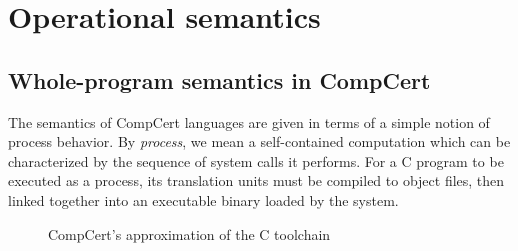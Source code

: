 \documentclass[acmsmall,authordraft]{acmart}
\begin{document}


\section{Operational semantics} \label{sec:sem} %


\subsection{Whole-program semantics in CompCert} \label{sec:sem:closed} %

The semantics of CompCert languages
are given in terms of a simple notion of process behavior.
By \emph{process}, we mean a self-contained computation
which can be characterized by
the sequence of system calls it performs.
For a C program to be executed as a process,
its translation units must be compiled to object files,
then linked together
into an executable binary
loaded by the system.

\begin{figure} %
    \caption{CompCert's approximation of the C toolchain}
    \label{fig:process}
\end{figure}
\end{document}
